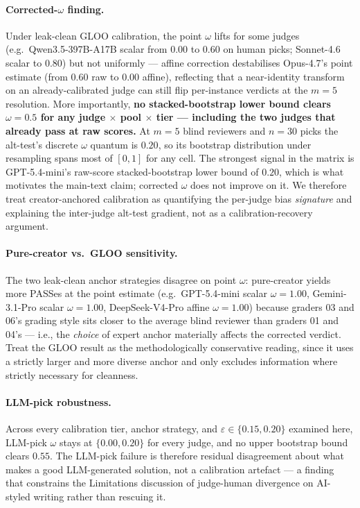 \documentclass[11pt]{article}
\begin{document}
\paragraph{Corrected-$\omega$ finding.} Under leak-clean GLOO
calibration, the point \(\omega\) lifts for some judges
(e.g.~Qwen3.5-397B-A17B scalar from \(0.00\) to \(0.60\) on human picks;
Sonnet-4.6 scalar to \(0.80\)) but not uniformly --- affine correction
destabilises Opus-4.7's point estimate (from \(0.60\) raw to \(0.00\)
affine), reflecting that a near-identity transform on an
already-calibrated judge can still flip per-instance verdicts at the
\(m=5\) resolution. More importantly, \textbf{no stacked-bootstrap lower
bound clears \(\omega=0.5\) for any judge \(\times\) pool \(\times\)
tier --- including the two judges that already pass at raw scores.} At
\(m=5\) blind reviewers and \(n=30\) picks the alt-test's discrete
\(\omega\) quantum is \(0.20\), so its bootstrap distribution under
resampling spans most of \([0,1]\) for any cell. The strongest signal in
the matrix is GPT-5.4-mini's raw-score stacked-bootstrap lower bound of
\(0.20\), which is what motivates the main-text claim; corrected
\(\omega\) does not improve on it. We therefore treat creator-anchored
calibration as quantifying the per-judge bias \emph{signature} and
explaining the inter-judge alt-test gradient, not as a
calibration-recovery argument.

\paragraph{Pure-creator vs.\ GLOO sensitivity.} The two leak-clean
anchor strategies disagree on point \(\omega\): pure-creator yields more
PASSes at the point estimate (e.g.~GPT-5.4-mini scalar \(\omega=1.00\),
Gemini-3.1-Pro scalar \(\omega=1.00\), DeepSeek-V4-Pro affine
\(\omega=1.00\)) because graders 03 and 06's grading style sits closer
to the average blind reviewer than graders 01 and 04's --- i.e., the
\emph{choice} of expert anchor materially affects the corrected verdict.
Treat the GLOO result as the methodologically conservative reading,
since it uses a strictly larger and more diverse anchor and only
excludes information where strictly necessary for cleanness.

\paragraph{LLM-pick robustness.} Across every calibration tier, anchor
strategy, and \(\varepsilon \in \{0.15, 0.20\}\) examined here, LLM-pick
\(\omega\) stays at \(\{0.00, 0.20\}\) for every judge, and no upper
bootstrap bound clears \(0.55\). The LLM-pick failure is therefore
residual disagreement about what makes a good LLM-generated solution,
not a calibration artefact --- a finding that constrains the Limitations
discussion of judge-human divergence on AI-styled writing rather than
rescuing it.
\end{document}
